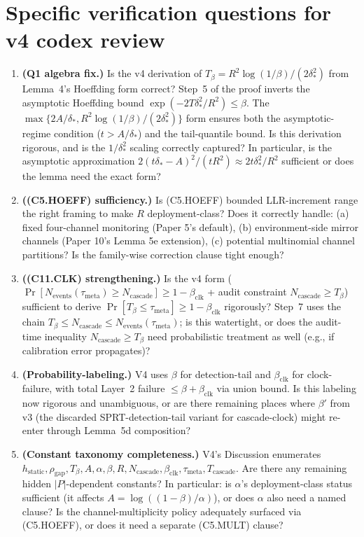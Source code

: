 \documentclass{article}
\newcommand{\deltastar}{\delta_{*}}
\newcommand{\rhogap}{\rho_{\mathrm{gap}}}
\newcommand{\Tbeta}{T_{\beta}}
\newcommand{\Ncasc}{N_{\mathrm{cascade}}}
\newcommand{\Nev}{N_{\mathrm{events}}}
\newcommand{\bclk}{\beta_{\mathrm{clk}}}
\begin{document}
\section{Specific verification questions for v4 codex review}

\begin{enumerate}
\item \textbf{(Q1 algebra fix.)}  Is the v4 derivation of $\Tbeta =
  R^2 \log(1/\beta)/(2\deltastar^2)$ from Lemma~4's Hoeffding form
  correct?  Step~5 of the proof inverts the asymptotic Hoeffding
  bound $\exp(-2T\deltastar^2/R^2) \leq \beta$.  The
  $\max\{2A/\deltastar, R^2\log(1/\beta)/(2\deltastar^2)\}$ form
  ensures both the asymptotic-regime condition
  ($t > A/\deltastar$) and the tail-quantile bound.  Is this
  derivation rigorous, and is the $1/\deltastar^2$ scaling
  correctly captured?  In particular, is the asymptotic
  approximation $2(t\deltastar - A)^2/(tR^2) \approx 2t\deltastar^2/R^2$
  sufficient or does the lemma need the exact form?

\item \textbf{((C5.HOEFF) sufficiency.)}  Is (C5.HOEFF) bounded
  LLR-increment range the right framing to make $R$ deployment-class?
  Does it correctly handle: (a) fixed four-channel monitoring (Paper
  5's default), (b) environment-side mirror channels (Paper 10's
  Lemma 5e extension), (c) potential multinomial channel partitions?
  Is the family-wise correction clause tight enough?

\item \textbf{((C11.CLK) strengthening.)}  Is the v4 form
  ($\Pr[\Nev(\tau_{\mathrm{meta}}) \geq \Ncasc] \geq 1 - \bclk$ +
  audit constraint $\Ncasc \geq \Tbeta$) sufficient to derive
  $\Pr[\Tbeta \leq \tau_{\mathrm{meta}}] \geq 1 - \bclk$ rigorously?
  Step~7 uses the chain $\Tbeta \leq \Ncasc \leq
  \Nev(\tau_{\mathrm{meta}})$; is this watertight, or does the
  audit-time inequality $\Ncasc \geq \Tbeta$ need probabilistic
  treatment as well (e.g., if calibration error propagates)?

\item \textbf{(Probability-labeling.)}  V4 uses $\beta$ for
  detection-tail and $\bclk$ for clock-failure, with total Layer~2
  failure $\leq \beta + \bclk$ via union bound.  Is this labeling
  now rigorous and unambiguous, or are there remaining places where
  $\beta'$ from v3 (the discarded SPRT-detection-tail variant for
  cascade-clock) might re-enter through Lemma~5d composition?

\item \textbf{(Constant taxonomy completeness.)}  V4's Discussion
  enumerates $h_{\mathrm{static}}, \rhogap, \Tbeta, A, \alpha,
  \beta, R, \Ncasc, \bclk, \tau_{\mathrm{meta}}, T_{\mathrm{cascade}}$.
  Are there any remaining hidden $|P|$-dependent constants?  In
  particular: is $\alpha$'s deployment-class status sufficient (it
  affects $A = \log((1-\beta)/\alpha)$), or does $\alpha$ also
  need a named clause?  Is the channel-multiplicity policy
  adequately surfaced via (C5.HOEFF), or does it need a separate
  (C5.MULT) clause?
\end{enumerate}
\end{document}
